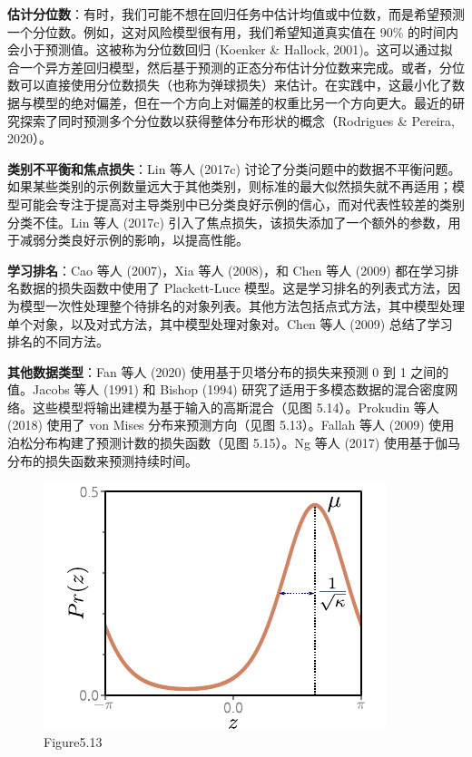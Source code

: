 \documentclass[lang=cn,newtx,10pt,scheme=chinese]{elegantbook}
\begin{document}
\textbf{估计分位数}：有时，我们可能不想在回归任务中估计均值或中位数，而是希望预测一个分位数。例如，这对风险模型很有用，我们希望知道真实值在 90\% 的时间内会小于预测值。这被称为分位数回归 (Koenker \& Hallock, 2001)。这可以通过拟合一个异方差回归模型，然后基于预测的正态分布估计分位数来完成。或者，分位数可以直接使用分位数损失（也称为弹球损失）来估计。在实践中，这最小化了数据与模型的绝对偏差，但在一个方向上对偏差的权重比另一个方向更大。最近的研究探索了同时预测多个分位数以获得整体分布形状的概念（Rodrigues \& Pereira, 2020）。

\textbf{类别不平衡和焦点损失}：Lin 等人 (2017c) 讨论了分类问题中的数据不平衡问题。如果某些类别的示例数量远大于其他类别，则标准的最大似然损失就不再适用；模型可能会专注于提高对主导类别中已分类良好示例的信心，而对代表性较差的类别分类不佳。Lin 等人 (2017c) 引入了焦点损失，该损失添加了一个额外的参数，用于减弱分类良好示例的影响，以提高性能。

\textbf{学习排名}：Cao 等人 (2007)，Xia 等人 (2008)，和 Chen 等人 (2009) 都在学习排名数据的损失函数中使用了 Plackett-Luce 模型。这是学习排名的列表式方法，因为模型一次性处理整个待排名的对象列表。其他方法包括点式方法，其中模型处理单个对象，以及对式方法，其中模型处理对象对。Chen 等人 (2009) 总结了学习排名的不同方法。

\textbf{其他数据类型}：Fan 等人 (2020) 使用基于贝塔分布的损失来预测 0 到 1 之间的值。Jacobs 等人 (1991) 和 Bishop (1994) 研究了适用于多模态数据的混合密度网络。这些模型将输出建模为基于输入的高斯混合（见图 5.14）。Prokudin 等人 (2018) 使用了 von Mises 分布来预测方向（见图 5.13）。Fallah 等人 (2009) 使用泊松分布构建了预测计数的损失函数（见图 5.15）。Ng 等人 (2017) 使用基于伽马分布的损失函数来预测持续时间。

\begin{figure}[ht!]
	\centering
	\includegraphics[width=0.7\linewidth]{PDFFigures/UDLChap5PDF/LossVonMises.pdf}
	\caption{Figure5.13}
\end{figure}
\end{document}
